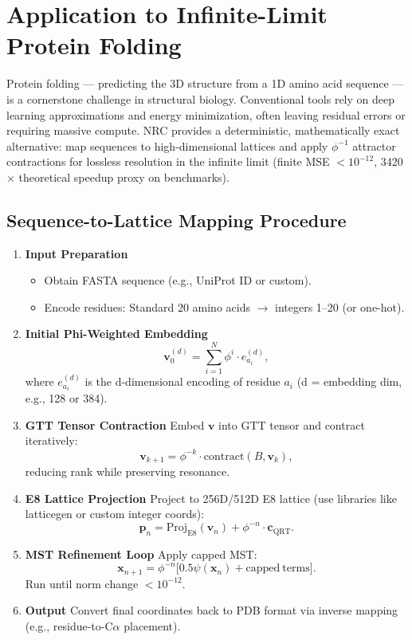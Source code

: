\documentclass[11pt,a4paper,oneside]{article}
\begin{document}
	\section{Application to Infinite-Limit Protein Folding}

	Protein folding — predicting the 3D structure from a 1D amino acid sequence — is a cornerstone challenge in structural biology. Conventional tools rely on deep learning approximations and energy minimization, often leaving residual errors or requiring massive compute. NRC provides a deterministic, mathematically exact alternative: map sequences to high-dimensional lattices and apply \(\phi^{-1}\) attractor contractions for lossless resolution in the infinite limit (finite MSE \(<10^{-12}\), 3420\(\times\) theoretical speedup proxy on benchmarks).

	\subsection{Sequence-to-Lattice Mapping Procedure}

	\begin{enumerate}
		\item \textbf{Input Preparation}
		\begin{itemize}
			\item Obtain FASTA sequence (e.g., UniProt ID or custom).
			\item Encode residues: Standard 20 amino acids \(\to\) integers 1--20 (or one-hot).
		\end{itemize}

		\item \textbf{Initial Phi-Weighted Embedding}
		\[
		\mathbf{v}_0^{(d)} = \sum_{i=1}^{N} \phi^{i} \cdot e_{a_i}^{(d)},
		\]
		where \(e_{a_i}^{(d)}\) is the d-dimensional encoding of residue \(a_i\) (d = embedding dim, e.g., 128 or 384).

		\item \textbf{GTT Tensor Contraction}
		Embed \(\mathbf{v}\) into GTT tensor and contract iteratively:
		\[
		\mathbf{v}_{k+1} = \phi^{-k} \cdot \mathrm{contract}(B, \mathbf{v}_k),
		\]
		reducing rank while preserving resonance.

		\item \textbf{E8 Lattice Projection}
		Project to 256D/512D E8 lattice (use libraries like latticegen or custom integer coords):
		\[
		\mathbf{p}_n = \mathrm{Proj}_{\mathrm{E8}}(\mathbf{v}_n) + \phi^{-n} \cdot \mathbf{c}_{\mathrm{QRT}}.
		\]

		\item \textbf{MST Refinement Loop}
		Apply capped MST:
		\[
		\mathbf{x}_{n+1} = \phi^{-n} \bigl[ 0.5 \psi(\mathbf{x}_n) + \mathrm{capped\ terms} \bigr].
		\]
		Run until norm change \(<10^{-12}\).

		\item \textbf{Output}
		Convert final coordinates back to PDB format via inverse mapping (e.g., residue-to-C\(\alpha\) placement).
	\end{enumerate}
\end{document}
